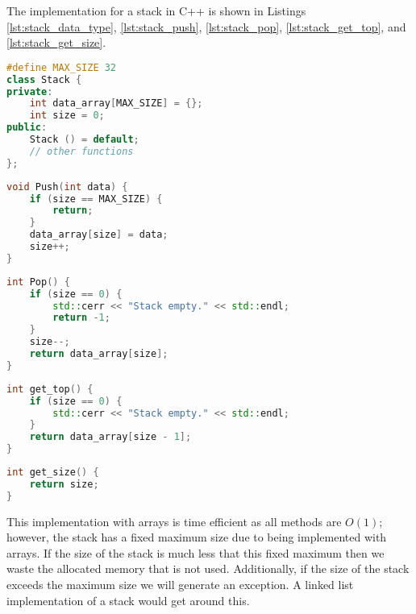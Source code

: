 The implementation for a stack in C++ is shown in Listings \ref{lst:stack_data_type}, \ref{lst:stack_push}, \ref{lst:stack_pop}, \ref{lst:stack_get_top}, and \ref{lst:stack_get_size}.

\begin{lstlisting}[float,
                  language = C++,
                  caption = {Stack data type in C++.},
                  label = {lst:stack_data_type}]
#define MAX_SIZE 32
class Stack {
private:
    int data_array[MAX_SIZE] = {};
    int size = 0;
public:
    Stack () = default;
    // other functions
};
\end{lstlisting}

\begin{lstlisting}[float,
                  language = C++,
                  caption = {Push function for stack data type in C++.},
                  label = {lst:stack_push}]
void Push(int data) {
    if (size == MAX_SIZE) {
        return;
    }
    data_array[size] = data;
    size++;
}
\end{lstlisting}

\begin{lstlisting}[float,
                  language = C++,
                  caption = {Pop function for stack data type in C++.},
                  label = {lst:stack_pop}]
int Pop() {
    if (size == 0) {
        std::cerr << "Stack empty." << std::endl;
        return -1;
    }
    size--;
    return data_array[size];
}
\end{lstlisting}

\begin{lstlisting}[float,
                  language = C++,
                  caption = {Get top element function for stack data type in C++.},
                  label = {lst:stack_get_top}]
int get_top() {
    if (size == 0) {
        std::cerr << "Stack empty." << std::endl;
    }
    return data_array[size - 1];
}
\end{lstlisting}

\begin{lstlisting}[float,
                  language = C++,
                  caption = {Get size function for stack data type in C++.},
                  label = {lst:stack_get_size}]
int get_size() {
    return size;
}
\end{lstlisting}

This implementation with arrays is time efficient as all methods are $O(1)$; however, the stack has a fixed maximum size due to being implemented with arrays. If the size of the stack is much less that this fixed maximum then we waste the allocated memory that is not used. Additionally, if the size of the stack exceeds the maximum size we will generate an exception. A linked list implementation of a stack would get around this.

